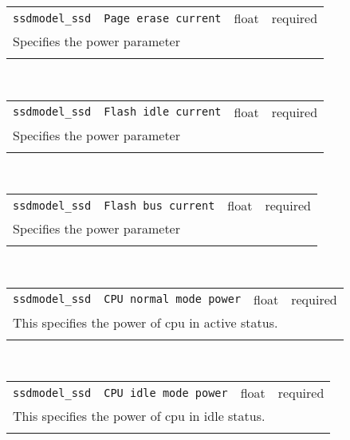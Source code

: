 \noindent 
\begin{tabular}{|p{\lpmodwidth}|p{\lpnamewidth}|p{0.5in}|p{0.5in}|}
\cline{1-4}
\texttt{ssdmodel\_ssd} & \texttt{Page erase current} & float & required \\ 
\cline{1-4}
\multicolumn{4}{|p{6in}|}{
Specifies the power parameter
}\\ 
\cline{1-4}
\multicolumn{4}{p{5in}}{}\\
\end{tabular}\\ 
\noindent 
\begin{tabular}{|p{\lpmodwidth}|p{\lpnamewidth}|p{0.5in}|p{0.5in}|}
\cline{1-4}
\texttt{ssdmodel\_ssd} & \texttt{Flash idle current} & float & required \\ 
\cline{1-4}
\multicolumn{4}{|p{6in}|}{
Specifies the power parameter
}\\ 
\cline{1-4}
\multicolumn{4}{p{5in}}{}\\
\end{tabular}\\ 
\noindent 
\begin{tabular}{|p{\lpmodwidth}|p{\lpnamewidth}|p{0.5in}|p{0.5in}|}
\cline{1-4}
\texttt{ssdmodel\_ssd} & \texttt{Flash bus current} & float & required \\ 
\cline{1-4}
\multicolumn{4}{|p{6in}|}{
Specifies the power parameter
}\\ 
\cline{1-4}
\multicolumn{4}{p{5in}}{}\\
\end{tabular}\\ 
\noindent 
\begin{tabular}{|p{\lpmodwidth}|p{\lpnamewidth}|p{0.5in}|p{0.5in}|}
\cline{1-4}
\texttt{ssdmodel\_ssd} & \texttt{CPU normal mode power} & float & required \\ 
\cline{1-4}
\multicolumn{4}{|p{6in}|}{
This specifies the power of cpu in active status.
}\\ 
\cline{1-4}
\multicolumn{4}{p{5in}}{}\\
\end{tabular}\\ 
\noindent 
\begin{tabular}{|p{\lpmodwidth}|p{\lpnamewidth}|p{0.5in}|p{0.5in}|}
\cline{1-4}
\texttt{ssdmodel\_ssd} & \texttt{CPU idle mode power} & float & required \\ 
\cline{1-4}
\multicolumn{4}{|p{6in}|}{
This specifies the power of cpu in idle status.
}\\ 
\cline{1-4}
\multicolumn{4}{p{5in}}{}\\
\end{tabular}\\ 
